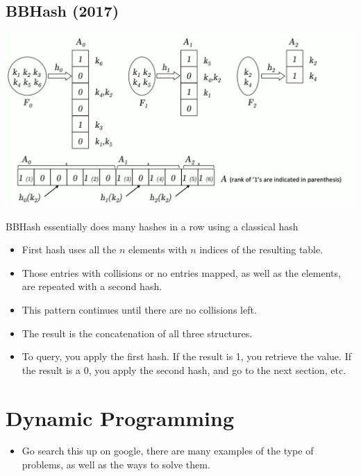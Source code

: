 \documentclass[10pt]{article}
\begin{document}
\subsection*{BBHash (2017)}
\begin{center}
    \includegraphics[width=\textwidth]{W2_7.png}
\end{center}
BBHash essentially does many hashes in a row using a classical hash
\begin{itemize}
    \item First hash uses all the $n$ elements with $n$ indices of the resulting table.  
    \item Those entries with collisions or no entries mapped, as well as the elements, are repeated with a second hash.
    \item This pattern continues until there are no collisions left.
    \item The result is the concatenation of all three structures.
    \item To query, you apply the first hash.  If the result is 1, you retrieve the value.  If the result is a 0, you apply the second hash, and go to the next section, etc.
\end{itemize}

\section*{Dynamic Programming}
\begin{itemize}
    \item Go search this up on google, there are many examples of the type of problems, as well as the ways to solve them.
\end{itemize}
\end{document}
